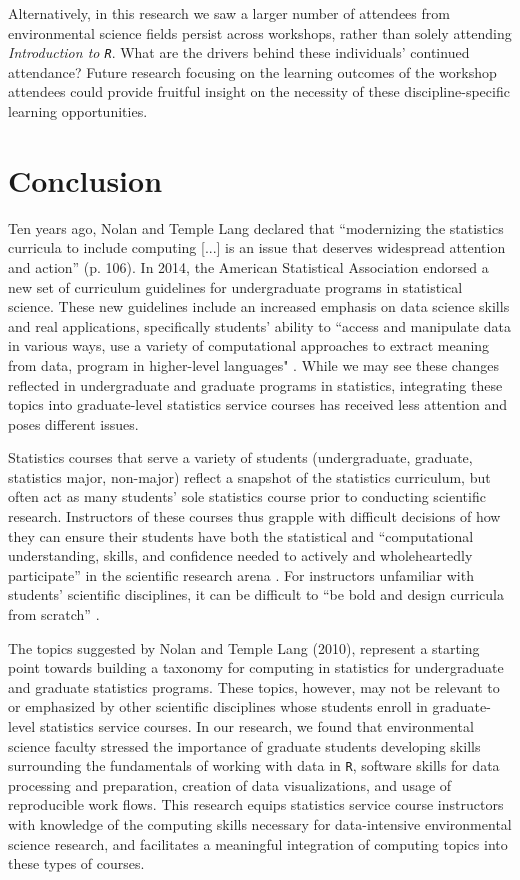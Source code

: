 \documentclass[12pt]{article}
\begin{document}
\quad Alternatively, in this research we saw a larger number of attendees from environmental science fields persist across workshops, rather than solely attending \emph{Introduction to \texttt{R}}. What are the drivers behind these individuals' continued attendance? Future research focusing on the learning outcomes of the workshop attendees could provide fruitful insight on the necessity of these discipline-specific learning opportunities. 



\section{Conclusion}
\label{sec:conclusion}

\quad Ten years ago, Nolan and Temple Lang declared that ``modernizing the statistics curricula to include computing [...] is an issue that deserves widespread attention and action'' (p. 106). In 2014, the American Statistical Association endorsed a new set of curriculum guidelines for undergraduate programs in statistical science. These new guidelines include an increased emphasis on data science skills and real applications, specifically students' ability to ``access and manipulate data in various ways, use a variety of computational approaches to extract meaning from data, program in higher-level languages" \citep[p. 7]{asa}. While we may see these changes reflected in undergraduate and graduate programs in statistics, integrating these topics into graduate-level statistics service courses has received less attention and poses different issues. 

\quad Statistics courses that serve a variety of students (undergraduate, graduate, statistics major, non-major) reflect a snapshot of the statistics curriculum, but often act as many students' sole statistics course prior to conducting scientific research. Instructors of these courses thus grapple with difficult decisions of how they can ensure their students have both the statistical and ``computational understanding, skills, and confidence needed to actively and wholeheartedly participate'' in the scientific research arena \citep[p. 106]{nolan}. For instructors unfamiliar with students' scientific disciplines, it can be difficult to ``be bold and design curricula from scratch'' \citep[p. 106]{nolan}.  

\quad The topics suggested by Nolan and Temple Lang (2010), represent a starting point towards building a taxonomy for computing in statistics for undergraduate and graduate statistics programs. These topics, however, may not be relevant to or emphasized by other scientific disciplines whose students enroll in graduate-level statistics service courses.  In our research, we found that environmental science faculty stressed the importance of graduate students developing skills surrounding the fundamentals of working with data in \texttt{R}, software skills for data processing and preparation, creation of data visualizations, and usage of reproducible work flows. This research equips statistics service course instructors with knowledge of the computing skills necessary for data-intensive environmental science research, and facilitates a meaningful integration of computing topics into these types of courses.   
\end{document}
